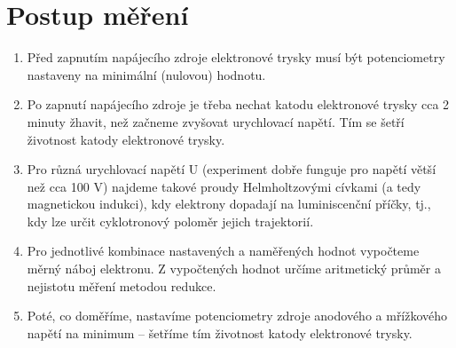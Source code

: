 \documentclass{report}
\begin{document}
	\section*{Postup měření}
		\begin{enumerate}
			\item Před zapnutím napájecího zdroje elektronové trysky musí být potenciometry nastaveny na minimální (nulovou) hodnotu.
			\item Po zapnutí napájecího zdroje je třeba nechat katodu elektronové trysky cca 2 minuty žhavit, než začneme zvyšovat urychlovací napětí. Tím se šetří životnost katody elektronové trysky.
			\item Pro různá urychlovací napětí U (experiment dobře funguje pro napětí větší než cca 100 V) najdeme takové proudy Helmholtzovými cívkami (a tedy magnetickou indukci), kdy elektrony dopadají na luminiscenční příčky, tj., kdy lze určit cyklotronový poloměr jejich trajektorií.
			\item Pro jednotlivé kombinace nastavených a naměřených hodnot vypočteme měrný náboj elektronu. Z vypočtených hodnot určíme aritmetický průměr a nejistotu měření metodou redukce.
			\item Poté, co doměříme, nastavíme potenciometry zdroje anodového a mřížkového napětí na minimum – šetříme tím životnost katody elektronové trysky.
		\end{enumerate}
	
\end{document}
